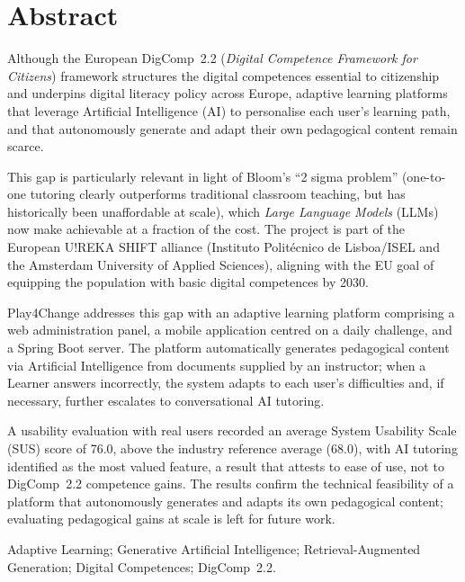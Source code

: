 \documentclass[a4paper,openright,twoside,11pt]{report}
\begin{document}
\chapter*{Abstract}
Although the European DigComp~2.2 (\textit{Digital Competence Framework for Citizens}) framework structures the digital competences essential to citizenship and underpins digital literacy policy across Europe, adaptive learning platforms that leverage Artificial Intelligence (AI) to personalise each user's learning path, and that autonomously generate and adapt their own pedagogical content remain scarce.

This gap is particularly relevant in light of Bloom's ``2 sigma problem'' (one-to-one tutoring clearly outperforms traditional classroom teaching, but has historically been unaffordable at scale), which \textit{Large Language Models} (LLMs) now make achievable at a fraction of the cost. The project is part of the European U!REKA SHIFT alliance (Instituto Politécnico de Lisboa/ISEL and the Amsterdam University of Applied Sciences), aligning with the EU goal of equipping the population with basic digital competences by 2030.

Play4Change addresses this gap with an adaptive learning platform comprising a web administration panel, a mobile application centred on a daily challenge, and a Spring Boot server. The platform automatically generates pedagogical content via Artificial Intelligence from documents supplied by an instructor; when a Learner answers incorrectly, the system adapts to each user's difficulties and, if necessary, further escalates to conversational AI tutoring.

A usability evaluation with real users recorded an average System Usability Scale (SUS) score of 76.0, above the industry reference average (68.0), with AI tutoring identified as the most valued feature, a result that attests to ease of use, not to DigComp~2.2 competence gains. The results confirm the technical feasibility of a platform that autonomously generates and adapts its own pedagogical content; evaluating pedagogical gains at scale is left for future work.

\vspace{5mm}
 Adaptive Learning; Generative Artificial Intelligence; Retrieval-Augmented Generation; Digital Competences; DigComp~2.2.

\end{document}
